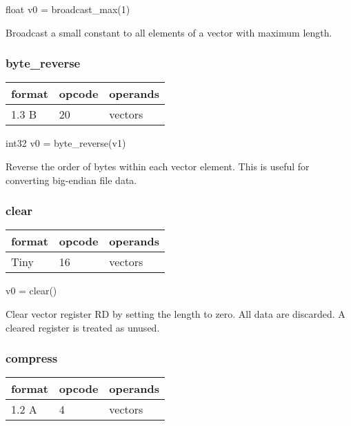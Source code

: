 \documentclass[forwardcom.tex]{subfiles}
\begin{document}
float v0 = broadcast\_max(1)
\vspace{2mm}

Broadcast a small constant to all elements of a vector with maximum length.
\vspace{2mm}

\subsubsection{byte\_reverse}

\label{table:byteReverseInstruction}
\begin{tabular}{|p{12mm}|p{12mm}|p{110mm}|}
\hline
\bfseries format & \bfseries opcode & \bfseries operands \\ \hline
1.3 B & 20 & vectors \\ \hline
\end{tabular}
\vspace{2mm}

int32 v0 = byte\_reverse(v1)
\vspace{2mm}

Reverse the order of bytes within each vector element. This is useful for converting big-endian file data.

\subsubsection{clear}
\label{table:clearInstruction}
\begin{tabular}{|p{12mm}|p{12mm}|p{110mm}|}
\hline
\bfseries format & \bfseries opcode & \bfseries operands \\ \hline
Tiny & 16 & vectors \\ \hline
\end{tabular}
\vspace{2mm}

v0 = clear()
\vspace{2mm}

Clear vector register RD by setting the length to zero. All data are discarded. A cleared register is treated as unused. 

\subsubsection{compress}
\label{table:compressInstruction}
\begin{tabular}{|p{12mm}|p{12mm}|p{110mm}|}
\hline
\bfseries format & \bfseries opcode & \bfseries operands \\ \hline
1.2 A & 4 & vectors \\ \hline
\end{tabular}
\vspace{2mm}
\end{document}
